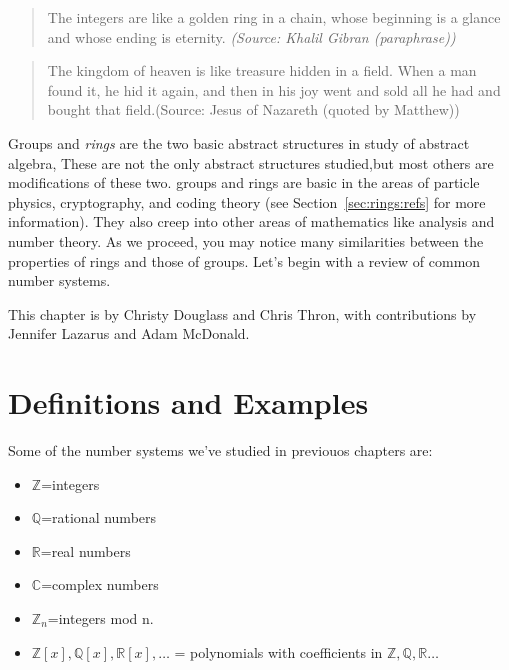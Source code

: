 
\begin{quote}
The integers are like a golden ring in a chain, whose beginning is a glance and whose ending is eternity.     
\emph{(Source:  Khalil Gibran (\emph{paraphrase}))}
\end{quote}

\begin{quote}
The kingdom of heaven is like treasure hidden in a field. When a man found it, he hid it again, and then in his joy went and sold all he had and bought that field.(Source:  Jesus of Nazareth (quoted by Matthew))
\end{quote}

Groups and  \emph{rings} are the two basic abstract structures in study of abstract algebra, These are not the only abstract structures studied,but most others are  modifications of these two. groups and rings are basic in the areas of particle physics, cryptography, and coding theory (see Section~\ref{sec:rings:refs} for more information). They also creep into other areas of mathematics like analysis and number theory.
 As we proceed, you may notice many similarities between the properties of rings and those of groups. Let's begin with a review of common number systems.

This chapter is by Christy Douglass and Chris Thron, with contributions by Jennifer Lazarus and Adam McDonald.

\section{Definitions and Examples \quad{}}
\label{sec:Rings:DefinitionsAndExamples}

Some of the number systems we've studied in previouos chapters are:
\begin{itemize}
\item ${\mathbb Z}$=integers
\item ${\mathbb Q}$=rational numbers
\item ${\mathbb R}$=real numbers
\item ${\mathbb C}$=complex numbers
\item ${\mathbb Z}_n$=integers mod n.
\item ${\mathbb Z}[x],  {\mathbb Q}[x], {\mathbb R}[x], \ldots$ = polynomials with coefficients in ${\mathbb Z, \mathbb Q, \mathbb R  \ldots}$     
\end{itemize}

